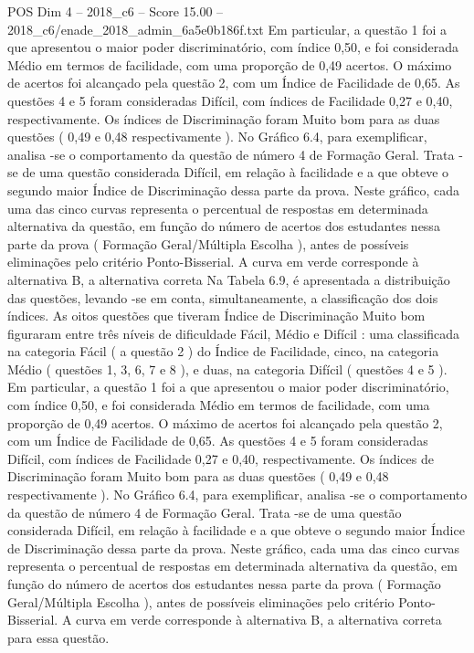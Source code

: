 \begin{textsample}{POS Dim 4 – 2018\_c6 – Score 15.00 – 2018\_c6/enade\_2018\_admin\_6a5e0b186f.txt}
Em particular, a questão 1 foi a que apresentou o maior poder discriminatório, com índice 0,50, e foi considerada Médio em termos de facilidade, com uma proporção de 0,49 acertos.
O máximo de acertos foi alcançado pela questão 2, com um Índice de Facilidade de 0,65.
As questões 4 e 5 foram consideradas Difícil, com índices de Facilidade 0,27 e 0,40, respectivamente.
Os índices de Discriminação foram Muito bom para as duas questões ( 0,49 e 0,48 respectivamente ).
No Gráfico 6.4, para exemplificar, analisa -se o comportamento da questão de número 4 de Formação Geral.
Trata -se de uma questão considerada Difícil, em relação à facilidade e a que obteve o segundo maior Índice de Discriminação dessa parte da prova.
Neste gráfico, cada uma das cinco curvas representa o percentual de respostas em determinada alternativa da questão, em função do número de acertos dos estudantes nessa parte da prova ( Formação Geral/Múltipla Escolha ), antes de possíveis eliminações pelo critério Ponto-Bisserial.
A curva em verde corresponde à alternativa B, a alternativa correta Na Tabela 6.9, é apresentada a distribuição das questões, levando -se em conta, simultaneamente, a classificação dos dois índices.
As oitos questões que tiveram Índice de Discriminação Muito bom figuraram entre três níveis de dificuldade Fácil, Médio e Difícil : uma classificada na categoria Fácil ( a questão 2 ) do Índice de Facilidade, cinco, na categoria Médio ( questões 1, 3, 6, 7 e 8 ), e duas, na categoria Difícil ( questões 4 e 5 ).
Em particular, a questão 1 foi a que apresentou o maior poder discriminatório, com índice 0,50, e foi considerada Médio em termos de facilidade, com uma proporção de 0,49 acertos.
O máximo de acertos foi alcançado pela questão 2, com um Índice de Facilidade de 0,65.
As questões 4 e 5 foram consideradas Difícil, com índices de Facilidade 0,27 e 0,40, respectivamente.
Os índices de Discriminação foram Muito bom para as duas questões ( 0,49 e 0,48 respectivamente ).
No Gráfico 6.4, para exemplificar, analisa -se o comportamento da questão de número 4 de Formação Geral.
Trata -se de uma questão considerada Difícil, em relação à facilidade e a que obteve o segundo maior Índice de Discriminação dessa parte da prova.
Neste gráfico, cada uma das cinco curvas representa o percentual de respostas em determinada alternativa da questão, em função do número de acertos dos estudantes nessa parte da prova ( Formação Geral/Múltipla Escolha ), antes de possíveis eliminações pelo critério Ponto-Bisserial.
A curva em verde corresponde à alternativa B, a alternativa correta para essa questão.

\end{textsample}
